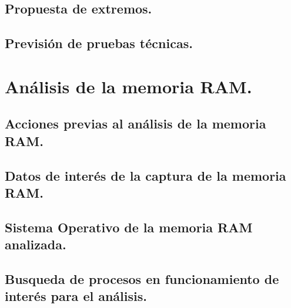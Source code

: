 \documentclass[12pt,a4paper]{report}
\begin{document}
\section{Propuesta de extremos.}

\clearpage

\section{Previsión de pruebas técnicas.}
 
\clearpage

\chapter{Análisis de la memoria RAM.}

\clearpage

\section{Acciones previas al análisis de la memoria RAM.}

\clearpage

\section{Datos de interés de la captura de la memoria RAM.}

\clearpage

\section{Sistema Operativo de la memoria RAM analizada.}

\clearpage

\section{Busqueda de procesos en funcionamiento de interés para el análisis.}

\clearpage
\end{document}
